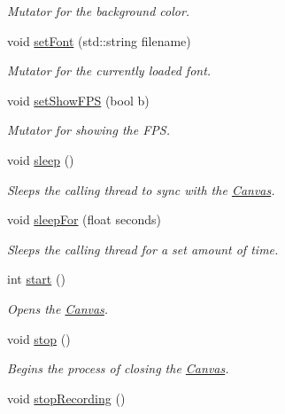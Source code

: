 \begin{DoxyCompactItemize}
\begin{DoxyCompactList}\small\item\em \-Mutator for the background color. \end{DoxyCompactList}\item 
void \hyperlink{classtsgl_1_1_canvas_a692edf8e37c7714cdf2a58ea530c63e9}{set\-Font} (std\-::string filename)
\begin{DoxyCompactList}\small\item\em \-Mutator for the currently loaded font. \end{DoxyCompactList}\item 
void \hyperlink{classtsgl_1_1_canvas_a8722c579dfa55a45e139bfeb269d73ff}{set\-Show\-F\-P\-S} (bool b)
\begin{DoxyCompactList}\small\item\em \-Mutator for showing the \-F\-P\-S. \end{DoxyCompactList}\item 
void \hyperlink{classtsgl_1_1_canvas_a2604fa056d4541f918ccf447eda1f3cf}{sleep} ()
\begin{DoxyCompactList}\small\item\em \-Sleeps the calling thread to sync with the \hyperlink{classtsgl_1_1_canvas}{\-Canvas}. \end{DoxyCompactList}\item 
void \hyperlink{classtsgl_1_1_canvas_a6674cc86b9a54b6a564021fddce47e36}{sleep\-For} (float seconds)
\begin{DoxyCompactList}\small\item\em \-Sleeps the calling thread for a set amount of time. \end{DoxyCompactList}\item 
int \hyperlink{classtsgl_1_1_canvas_a654315f9b08a9b3b072eebf4b4d8ae89}{start} ()
\begin{DoxyCompactList}\small\item\em \-Opens the \hyperlink{classtsgl_1_1_canvas}{\-Canvas}. \end{DoxyCompactList}\item 
void \hyperlink{classtsgl_1_1_canvas_a46cd37a9f2a146e57b4e0273faf6485c}{stop} ()
\begin{DoxyCompactList}\small\item\em \-Begins the process of closing the \hyperlink{classtsgl_1_1_canvas}{\-Canvas}. \end{DoxyCompactList}\item 
void \hyperlink{classtsgl_1_1_canvas_ac6035d87aa3bf077031bc0bb6f419b17}{stop\-Recording} ()

\end{DoxyCompactItemize}
